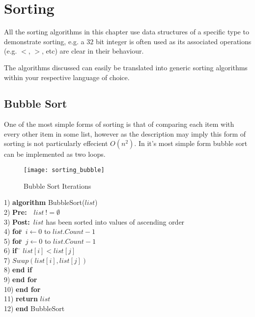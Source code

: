 \chapter{Sorting}
All the sorting algorithms in this chapter use data structures of a specific type to demonstrate sorting, e.g. a $32$ bit integer is often used as its associated operations (e.g. $<$, $>$, etc) are clear in their behaviour.

The algorithms discussed can easily be translated into generic sorting algorithms within your respective language of choice.

\section{Bubble Sort}
One of the most simple forms of sorting is that of comparing each item with every other item in some list, however as the description may imply this form of sorting is not particularly effecient $O(n^{2})$. In it's most simple form bubble sort can be implemented as two loops.

\begin{figure}[ht]
\begin{center}
\texttt{[image: sorting\_bubble]}
\end{center}
\caption{Bubble Sort Iterations} \label{fig:sorting_bubble}
\end{figure}

\begin{tabbing}
1)  \textbf{alg}\= \textbf{orithm} BubbleSort($list$) \\
2)  \> \textbf{Pre:}~~$list~!= \emptyset$ \\
3)  \> \textbf{Post:}~$list$ has been sorted into values of ascending order \\
4)  \> \textbf{for}\=~$i \leftarrow 0$ to $list.Count - 1$ \\
5)  \> \> \textbf{for}\=~$j \leftarrow 0$ to $list.Count - 1$ \\
6)  \> \> \> \textbf{if}~\= $list[i] < list[j]$ \\
7)  \> \> \> \> $Swap(list[i], list[j])$ \\
8)  \> \> \> \textbf{end if} \\
9)  \> \> \textbf{end for} \\
10) \> \textbf{end for} \\
11) \> \textbf{return} $list$ \\
12) \textbf{end} BubbleSort
\end{tabbing}

